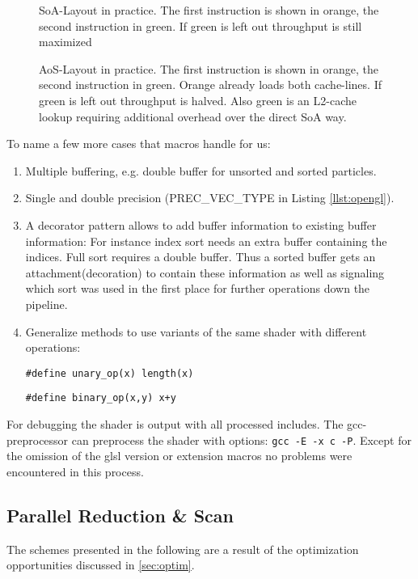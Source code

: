 \documentclass[m,times]{cgMA}
\begin{document}
\begin{figure}[htbp]
  \centering
  
  \caption{SoA-Layout in practice. The first instruction is shown in orange, the second instruction in green. If green is left out throughput is still maximized}
\label{fig:soa}
\end{figure}
\begin{figure}[htbp]  \centering
  
  \caption{AoS-Layout in practice. The first instruction is shown in orange, the second instruction in green. Orange already loads both cache-lines. If green is left out throughput is halved. Also green is an L2-cache lookup requiring additional overhead over the direct SoA way.}
\label{fig:aos}
\end{figure}

To name a few more cases that macros handle for us:
\begin{enumerate}
  \item Multiple buffering, e.g. double buffer for unsorted and sorted particles.
  \item Single and double precision (PREC\_VEC\_TYPE in Listing \ref{llst:opengl}).
  \item A decorator pattern allows to add buffer information to existing buffer information: For instance index sort needs an extra buffer containing the indices. Full sort requires a double buffer. Thus a sorted buffer gets an attachment(decoration) to contain these information as well as signaling which sort was used in the first place for further operations down the pipeline.
  \item Generalize methods to use variants of the same shader with different operations:

    \texttt{\#define unary\_op(x) length(x)}

    \texttt{\#define binary\_op(x,y) x+y}
\end{enumerate}
For debugging the shader is output with all processed includes. The gcc-pre\-pro\-ces\-sor can preprocess the shader with options: \texttt{gcc -E -x c -P}. Except for the omission of the glsl version or extension macros no problems were encountered in this process.

\subsection{Parallel Reduction \& Scan} \label{sec:red_scan}
The schemes presented in the following are a result of the optimization opportunities discussed in \ref{sec:optim}.
\end{document}
